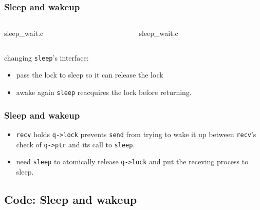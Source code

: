 \documentclass{beamer}
\begin{document}

\begin{frame}[t]
  \frametitle{Sleep and wakeup}
  \begin{columns}
    \begin{column}{.5\textwidth}
      
                      {sleep_wait.c}
    \end{column}
    \begin{column}{.425\textwidth}
      
                      {sleep_wait.c}
    \end{column}
  \end{columns}
  changing \texttt{sleep}'s interface:
  \begin{itemize}
  \item pass the lock to sleep so it can release the lock
  \item awake again \texttt{sleep} reacquires the lock before returning.
  \end{itemize}
  
\end{frame}


\begin{frame}[t]
  \frametitle{Sleep and wakeup}

  \begin{itemize}
  \item \texttt{recv} holds \texttt{q->lock} prevents \texttt{send} from trying to wake
    it up between \texttt{recv}'s check of \texttt{q->ptr} and its call to \texttt{sleep}.
  \item need \texttt{sleep} to atomically release \texttt{q->lock} and put the receving
    process to sleep.
  \end{itemize}
  
\end{frame}


\subsection{Code: Sleep and wakeup}

\end{document}
